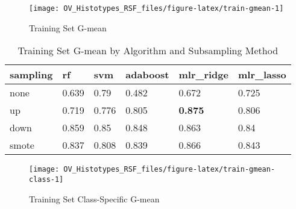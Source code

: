 \documentclass[
]{report}
\begin{document}
\begin{figure}[H]

{\centering \texttt{[image: OV\_Histotypes\_RSF\_files/figure-latex/train-gmean-1]} 

}

\caption{Training Set G-mean}\label{fig:train-gmean}
\end{figure}

\begin{table}

\caption{\label{tab:train-gmean-table}Training Set G-mean by Algorithm and Subsampling Method}
\centering
\begin{tabular}[t]{l|l|l|l|l|l}
\hline
sampling & rf & svm & adaboost & mlr\_ridge & mlr\_lasso\\
\hline
none & 0.639 & 0.79 & 0.482 & 0.672 & 0.725\\
\hline
up & 0.719 & 0.776 & 0.805 & \textbf{0.875} & 0.806\\
\hline
down & 0.859 & 0.85 & 0.848 & 0.863 & 0.84\\
\hline
smote & 0.837 & 0.808 & 0.839 & 0.866 & 0.843\\
\hline
\end{tabular}
\end{table}

\begin{figure}[H]

{\centering \texttt{[image: OV\_Histotypes\_RSF\_files/figure-latex/train-gmean-class-1]} 

}

\caption{Training Set Class-Specific G-mean}\label{fig:train-gmean-class}
\end{figure}
\end{document}
